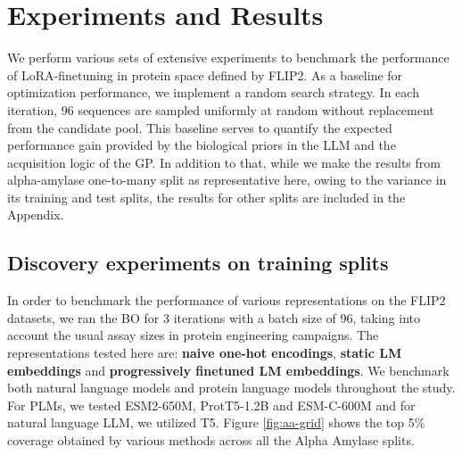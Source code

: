 \documentclass{article}
\theoremstyle{plain}
\theoremstyle{definition}
\theoremstyle{remark}
\begin{document}
\section{Experiments and Results}
We perform various sets of extensive experiments to benchmark the performance of LoRA-finetuning in protein space defined by FLIP2. As a baseline for optimization performance, we implement a random search strategy. In each iteration, 96 sequences are sampled uniformly at random without replacement from the candidate pool. This baseline serves to quantify the expected performance gain provided by the biological priors in the LLM and the acquisition logic of the GP. In addition to that, while we make the results from alpha-amylase one-to-many split as representative here, owing to the variance in its training and test splits, the results for other splits are included in the Appendix.

\subsection{Discovery experiments on training splits}
In order to benchmark the performance of various representations on the FLIP2 datasets, we ran the BO for 3 iterations with a batch size of 96, taking into account the usual assay sizes in protein engineering campaigns. The representations tested here are: \textbf{naive one-hot encodings}, \textbf{static LM embeddings} and \textbf{progressively finetuned LM embeddings}. We benchmark both natural language models and protein language models throughout the study. For PLMs, we tested ESM2-650M, ProtT5-1.2B and ESM-C-600M and for natural language LLM, we utilized T5. Figure \ref{fig:aa-grid} shows the top 5\% coverage obtained by various methods across all the Alpha Amylase splits.
\end{document}
